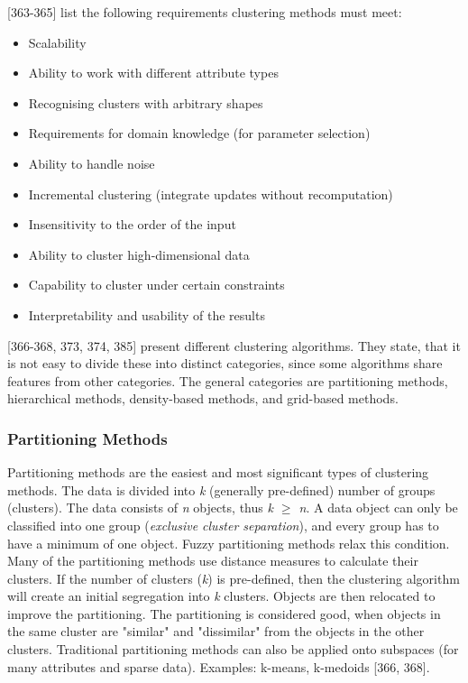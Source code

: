 \textcite{han2011data}[363-365] list the following requirements  clustering methods must meet:
\begin{itemize}
  \item Scalability
  \item Ability to work with different attribute types
  \item Recognising clusters with arbitrary shapes
  \item Requirements for domain knowledge (for parameter selection)
  \item Ability to handle noise
  \item Incremental clustering (integrate updates without recomputation)
  \item Insensitivity to the order of the input
  \item Ability to cluster high-dimensional data 
  \item Capability to cluster under certain constraints
  \item Interpretability and usability of the results
\end{itemize}


\textcite{han2011data}[366-368, 373, 374, 385] present different clustering algorithms. They state, that it is not easy to divide these into distinct categories, since some algorithms share features from other categories. The general categories are partitioning methods, hierarchical methods, density-based methods, and grid-based methods.

  \subsubsection{Partitioning Methods}
  Partitioning methods are the easiest and most significant types of clustering methods. The data is divided into \textit{k} (generally pre-defined) number of groups (clusters). The data consists of \textit{n} objects, thus \textit{k $\geq$ n}. A data object can only be classified into one group (\textit{exclusive cluster separation}), and every group has to have a minimum of one object. Fuzzy partitioning methods relax this condition.
  Many of the partitioning methods use distance measures to calculate their clusters. If the number of clusters (\textit{k}) is pre-defined, then the clustering algorithm will create an initial segregation into \textit{k} clusters. Objects are then relocated to improve the partitioning. The partitioning is considered good, when objects in the same cluster are "similar" and "dissimilar" from the objects in the other clusters. Traditional partitioning methods can also be applied onto subspaces (for many attributes and sparse data).  Examples: k-means, k-medoids \autocite{han2011data}[366, 368].
  

